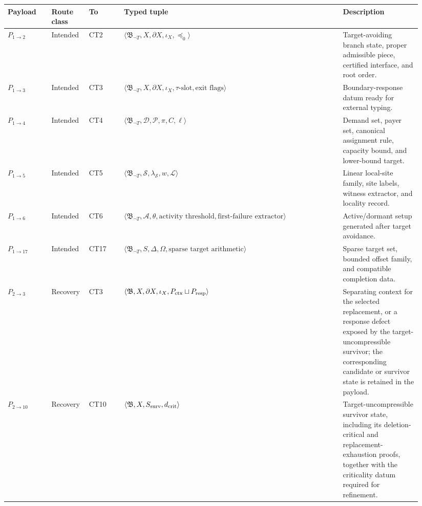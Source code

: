 \documentclass[
  11pt,
]{article}
\theoremstyle{definition}
\begin{document}
\begingroup
\tiny
\setlength{\tabcolsep}{1pt}
\begin{longtable}[]{@{}
  >{\raggedright\arraybackslash}p{0.10\linewidth}
  >{\raggedright\arraybackslash}p{0.08\linewidth}
  >{\raggedright\arraybackslash}p{0.08\linewidth}
  >{\raggedright\arraybackslash}p{0.50\linewidth}
  >{\raggedright\arraybackslash}p{0.18\linewidth}@{}}
\toprule\noalign{}
Payload & Route class & To & Typed tuple & Description \\
\midrule\noalign{}
\endhead
\bottomrule\noalign{}
\endlastfoot
\(P_{1\to2}\) & Intended & CT2 & \(\langle\mathfrak B_{\neg T},X,\partial X,\iota_X,\preceq_0\rangle\) & Target-avoiding branch state, proper admissible piece, certified interface, and root order. \\
\(P_{1\to3}\) & Intended & CT3 & \(\langle\mathfrak B_{\neg T},X,\partial X,\iota_X,\tau\text{-slot},\text{exit flags}\rangle\) & Boundary-response datum ready for external typing. \\
\(P_{1\to4}\) & Intended & CT4 & \(\langle\mathfrak B_{\neg T},\mathcal D,\mathcal P,\pi,C,\ell\rangle\) & Demand set, payer set, canonical assignment rule, capacity bound, and lower-bound target. \\
\(P_{1\to5}\) & Intended & CT5 & \(\langle\mathfrak B_{\neg T},\mathcal S,\lambda_{\mathcal S},w,\mathcal L\rangle\) & Linear local-site family, site labels, witness extractor, and locality record. \\
\(P_{1\to6}\) & Intended & CT6 & \(\langle\mathfrak B_{\neg T},\mathcal A,\theta,\text{activity threshold},\text{first-failure extractor}\rangle\) & Active/dormant setup generated after target avoidance. \\
\(P_{1\to17}\) & Intended & CT17 & \(\langle\mathfrak B_{\neg T},S,\Delta,\Omega,\text{sparse target arithmetic}\rangle\) & Sparse target set, bounded offset family, and compatible completion data. \\
\(P_{2\to3}\) & Recovery & CT3 & \(\langle\mathfrak B,X,\partial X,\iota_X,P_{\rm ctx}\sqcup P_{\rm resp}\rangle\) & Separating context for the selected replacement, or a response defect exposed by the target-uncompressible survivor; the corresponding candidate or survivor state is retained in the payload. \\
\(P_{2\to10}\) & Recovery & CT10 & \(\langle\mathfrak B,X,S_{\rm surv},d_{\rm crit}\rangle\) & Target-uncompressible survivor state, including its deletion-critical and replacement-exhaustion proofs, together with the criticality datum required for refinement. \\

\end{longtable}
\end{document}

